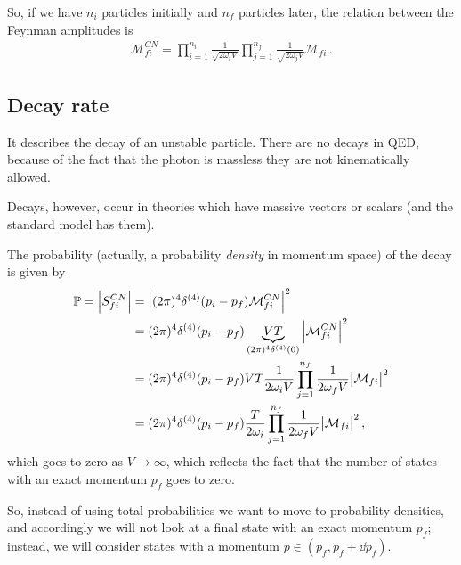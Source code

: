 \documentclass[main.tex]{subfiles}
\begin{document}
So, if we have \(n_i\) particles initially and \(n_f\) particles later, the relation between the Feynman amplitudes is 
%
\begin{align}
\mathcal{M}_{fi}^{CN} = \prod_{i=1}^{n_i} \frac{1}{\sqrt{2 \omega_{i}V}}
\prod_{j=1}^{n_f} \frac{1}{\sqrt{2 \omega_{j}V}} \mathcal{M}_{fi}
\,.
\end{align}


\subsection{Decay rate}


It describes the decay of an unstable particle. There are no decays in QED, because of the fact that the photon is massless they are not kinematically allowed. 

Decays, however, occur in theories which have massive vectors or scalars (and the standard model has them). 

The probability (actually, a probability \emph{density} in momentum space) of the decay is given by 
%
\begin{align}
\mathbb{P} = \abs{S^{CN}_{fi}} 
&= \abs{(2 \pi )^{4} \delta^{(4)} (p_i - p_f) \mathcal{M}^{CN}_{fi}}^2  \\
&= (2 \pi )^{4} \delta^{(4)} (p_i-p_f) \underbrace{VT}_{(2 \pi )^{4} \delta^{(4)}(0)} \abs{\mathcal{M}_{fi}^{CN}}^2  \\
&=  (2 \pi )^{4} \delta^{(4)} (p_i-p_f) VT \frac{1}{2 \omega_{i} V} \prod_{j=1}^{n_f} \frac{1}{2 \omega_{f} V} \abs{\mathcal{M}_{fi}}^2   \\
&= (2 \pi )^{4} \delta^{(4)} (p_i - p_f) \frac{T}{2 \omega_{i}}
\prod_{j=1}^{n_f} \frac{1}{2 \omega_{f} V} \abs{\mathcal{M}_{fi}}^2
\,,
\end{align}
%
which goes to zero as \(V \to \infty \), which reflects the fact that the number of states with an exact momentum \(p_f\) goes to zero. 

So, instead of using total probabilities we want to move to probability densities, and accordingly we will not look at a final state with an exact momentum \(p_f\); instead, we will consider states with a momentum \(p \in (p_f, p_f + \dd{p_f})\). 
\end{document}
